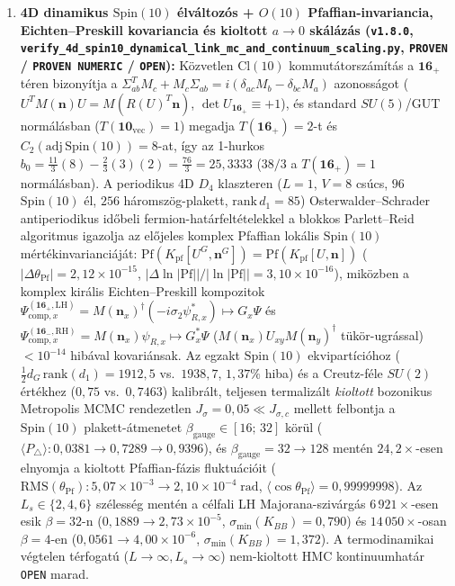 \documentclass[11pt,a4paper]{article}
\begin{document}
\begin{enumerate}
    \item \textbf{4D dinamikus $\mathrm{Spin}(10)$ élváltozós + $O(10)$ Pfaffian-invariancia, Eichten--Preskill kovariancia és kioltott $a\to 0$ skálázás (\texttt{v1.8.0}, \texttt{verify\_\allowbreak 4d\_\allowbreak spin10\_\allowbreak dynamical\_\allowbreak link\_\allowbreak mc\_\allowbreak and\_\allowbreak continuum\_\allowbreak scaling.py}, \texttt{PROVEN} / \texttt{PROVEN NUMERIC} / \texttt{OPEN}):}
    Közvetlen $\mathrm{Cl}(10)$ kommutátorszámítás a $\mathbf{16}_+$ téren bizonyítja a $\Sigma_{ab}^T M_c + M_c\Sigma_{ab} = i(\delta_{ac}M_b - \delta_{bc}M_a)$ azonosságot ($U^T M(\mathbf{n})U = M(R(U)^T\mathbf{n})$, $\det U_{\mathbf{16}_+}\equiv +1$), és standard $SU(5)$/GUT normálásban ($T(\mathbf{10}_{\mathrm{vec}})=1$) megadja $T(\mathbf{16}_+)=2$-t és $C_2(\mathrm{adj}\,\mathrm{Spin}(10))=8$-at, így az 1-hurkos $b_0 = \frac{11}{3}(8)-\frac{2}{3}(3)(2) = \frac{76}{3} = 25{,}3333$ ($38/3$ a $T(\mathbf{16}_+)=1$ normálásban). A periodikus 4D $D_4$ klaszteren ($L=1$, $V=8$ csúcs, $96$ $\mathrm{Spin}(10)$ él, $256$ háromszög-plakett, $\mathrm{rank}\,d_1=85$) Osterwalder--Schrader antiperiodikus időbeli fermion-határfeltételekkel a blokkos Parlett--Reid algoritmus \cite{Wimmer2012} igazolja az előjeles komplex Pfaffian lokális $\mathrm{Spin}(10)$ mértékinvarianciáját: $\mathrm{Pf}(K_{\mathrm{pf}}[U^G,\mathbf{n}^G]) = \mathrm{Pf}(K_{\mathrm{pf}}[U,\mathbf{n}])$ ($|\Delta\theta_{\mathrm{Pf}}|=2{,}12\times 10^{-15}$, $|\Delta\ln|\mathrm{Pf}||/|\ln|\mathrm{Pf}||=3{,}10\times 10^{-16}$), miközben a komplex királis Eichten--Preskill kompozitok $\Psi_{\mathrm{comp},x}^{(\mathbf{16}_+,\mathrm{LH})} = M(\mathbf{n}_x)^\dagger(-i\sigma_2\psi_{R,x}^*)\mapsto G_x\Psi$ és $\Psi_{\mathrm{comp},x}^{(\mathbf{16}_-,\mathrm{RH})} = M(\mathbf{n}_x)\psi_{R,x}\mapsto G_x^*\Psi$ ($M(\mathbf{n}_x)U_{xy}M(\mathbf{n}_y)^\dagger$ tükör-ugrással) $<10^{-14}$ hibával kovariánsak. Az egzakt $\mathrm{Spin}(10)$ ekvipartícióhoz ($\frac{1}{2}d_G\,\mathrm{rank}(d_1)=1912{,}5$ vs.\ $1938{,}7$, $1{,}37\%$ hiba) és a Creutz-féle $SU(2)$ értékhez ($0{,}75$ vs.\ $0{,}7463$) \cite{Creutz1983} kalibrált, teljesen termalizált \emph{kioltott} bozonikus Metropolis MCMC rendezetlen $J_\sigma=0{,}05\ll J_{\sigma,c}$ mellett felbontja a $\mathrm{Spin}(10)$ plakett-átmenetet $\beta_{\mathrm{gauge}}\in[16;\,32]$ körül ($\langle P_\triangle\rangle: 0{,}0381\to 0{,}7289\to 0{,}9396$), és $\beta_{\mathrm{gauge}}=32\to 128$ mentén $24{,}2\times$-esen elnyomja a kioltott Pfaffian-fázis fluktuációit ($\mathrm{RMS}(\theta_{\mathrm{Pf}}): 5{,}07\times 10^{-3}\to 2{,}10\times 10^{-4}\;\mathrm{rad}$, $\langle\cos\theta_{\mathrm{Pf}}\rangle=0{,}99999998$). Az $L_s\in\{2,4,6\}$ szélesség mentén a célfali LH Majorana-szivárgás $6\,921\times$-esen esik $\beta=32$-n ($0{,}1889\to 2{,}73\times 10^{-5}$, $\sigma_{\min}(K_{BB})=0{,}790$) és $14\,050\times$-osan $\beta=4$-en ($0{,}0561\to 4{,}00\times 10^{-6}$, $\sigma_{\min}(K_{BB})=1{,}372$). A termodinamikai végtelen térfogatú ($L\to\infty, L_s\to\infty$) nem-kioltott HMC kontinuumhatár \texttt{OPEN} marad.
\end{enumerate}
\end{document}
